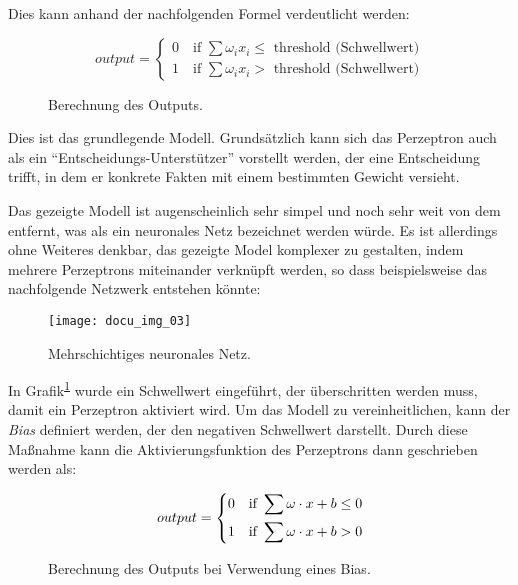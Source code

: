 Dies kann anhand der nachfolgenden Formel verdeutlicht werden:

\begin{figure}[H]
    \centering
    \[ output =
      \begin{cases}
        0 \quad \text{if } \sum \omega_i x_i \leqslant \text{ threshold (Schwellwert)}\\
        1 \quad \text{if } \sum \omega_i x_i > \text{ threshold (Schwellwert)}
      \end{cases}
    \]
    \caption{Berechnung des Outputs.}
    \label{fig:neuron-three-way}
\end{figure}

Dies ist das grundlegende Modell. Grundsätzlich kann sich das Perzeptron auch als ein ``Entscheidungs-Unterstützer'' vorstellt werden, der eine Entscheidung trifft, in dem er konkrete Fakten mit einem bestimmten Gewicht versieht.

Das gezeigte Modell ist augenscheinlich sehr simpel und noch sehr weit von dem entfernt, was als ein neuronales Netz bezeichnet werden würde. Es ist allerdings ohne Weiteres denkbar, das gezeigte Model komplexer zu gestalten, indem mehrere Perzeptrons miteinander verknüpft werden, so dass beispielsweise das nachfolgende Netzwerk entstehen könnte:

\begin{figure}[H]
    \centering
    \texttt{[image: docu\_img\_03]}
    \caption{Mehrschichtiges neuronales Netz.}
    \label{fig:multi-layer-net}
\end{figure}

In Grafik\textsuperscript{\ref{fig:neuron-three-way}} wurde ein Schwellwert eingeführt, der überschritten werden muss, damit ein Perzeptron aktiviert wird. Um das Modell zu vereinheitlichen, kann der \textit{Bias} definiert werden, der den negativen Schwellwert darstellt. Durch diese Maßnahme kann die Aktivierungsfunktion des Perzeptrons dann geschrieben werden als:

\begin{figure}[H]
    \centering
    \[ output =
          \begin{dcases}
            0 \quad \text{if } \sum \omega \cdot x + b \leq 0 \\
            1 \quad \text{if } \sum \omega \cdot x + b > 0
          \end{dcases}
    \]
    \caption{Berechnung des Outputs bei Verwendung eines Bias.}
    \label{fig:bias-calculation}
\end{figure}

